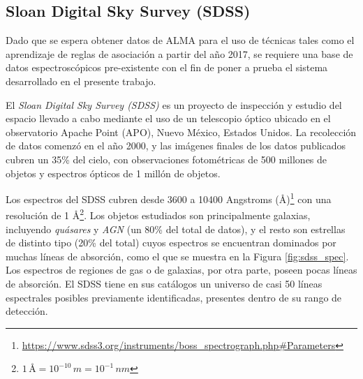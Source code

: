 \subsection{Sloan Digital Sky Survey (SDSS)}

Dado que se espera obtener datos de ALMA para el uso de técnicas tales como el aprendizaje de reglas de asociación a partir del año 2017, se requiere una base de datos espectroscópicos pre-existente con el fin de poner a prueba el sistema desarrollado en el presente trabajo.

El \textit{Sloan Digital Sky Survey (SDSS)} \cite{york2000sloan} es un proyecto de inspección y estudio del espacio llevado a cabo mediante el uso de un telescopio óptico ubicado en el observatorio Apache Point (APO), Nuevo México, Estados Unidos. La recolección de datos comenzó en el año 2000, y las imágenes finales de los datos publicados cubren un 35\% del cielo, con observaciones fotométricas de 500 millones de objetos y espectros ópticos de 1 millón de objetos.

Los espectros del SDSS cubren desde 3600 a 10400 Angstroms ({\AA})\footnote{\url{https://www.sdss3.org/instruments/boss_spectrograph.php\#Parameters}} con una resolución de 1 {\AA}\footnote{$1\,\text{{\AA}} = 10^{-10}\,m = 10^{-1}\,nm$}. Los objetos estudiados son principalmente galaxias, incluyendo \textit{quásares} y \textit{AGN} (un 80\% del total de datos), y el resto son estrellas de distinto tipo (20\% del total) cuyos espectros se encuentran dominados por muchas líneas de absorción, como el que se muestra en la Figura \ref{fig:sdss_spec}. Los espectros de regiones de gas o de galaxias, por otra parte, poseen pocas líneas de absorción. El SDSS tiene en sus catálogos un universo de casi 50 líneas espectrales posibles previamente identificadas, presentes dentro de su rango de detección.

